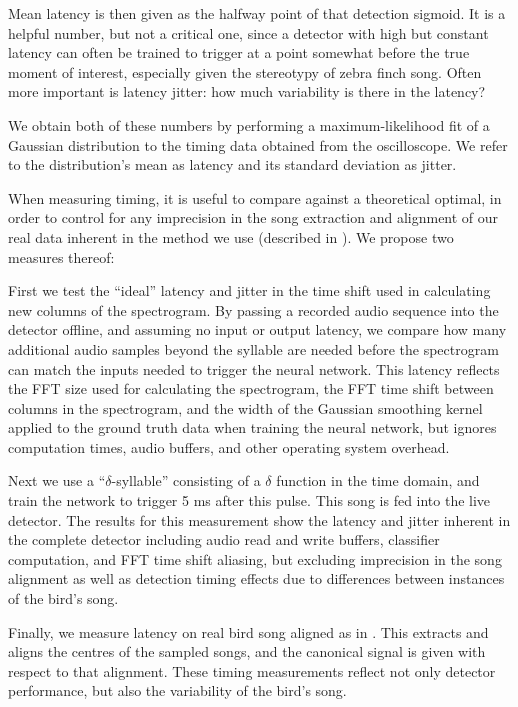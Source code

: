 \documentclass[10pt,letterpaper]{article}
\begin{document}
Mean latency is then given as the halfway point of that detection
sigmoid. It is a helpful number, but not a critical one, since a
detector with high but constant latency can often be trained to trigger at a
point somewhat before the true moment of interest, especially given the stereotypy of zebra finch song.  Often more
important is latency jitter: how much variability is there in
the latency?

We obtain both of these numbers by performing a maximum-likelihood fit of a Gaussian distribution to the timing data obtained from the oscilloscope.  We refer to the distribution's mean as latency and its standard deviation as jitter.

When measuring timing, it is useful to compare against a theoretical optimal, in order to control for any imprecision in the song extraction
and alignment of our real data inherent in the method we use (described in
\cite{Poole2012}).  We propose two measures thereof:

First we test the ``ideal'' latency and jitter in the time shift used in 
calculating new columns of the spectrogram. By passing a recorded 
audio sequence into the detector offline, and assuming no input or output 
latency, we compare how many additional audio 
samples beyond the syllable are needed before the spectrogram 
can match the inputs needed to trigger the neural network.  This latency reflects the 
FFT size used for calculating the spectrogram, the FFT time shift 
between columns in the spectrogram, and the width of the Gaussian 
smoothing kernel applied to the ground truth data when training 
the neural network, but ignores computation times, audio buffers, and other operating system overhead.

Next we use a ``$\delta$-syllable'' consisting
of a $\delta$ function in the time domain, and train the network to
trigger 5 ms after this pulse.  This song is fed into the live detector.  The results for this measurement show
the latency and jitter inherent in the complete detector
including audio read and write buffers, classifier
computation, and FFT time shift aliasing, but excluding imprecision in the song alignment as well as detection timing effects due to differences between instances of the bird's song.

Finally, we measure latency on real bird song aligned as in \cite{Poole2012}.  This extracts and aligns the centres of the sampled songs, and the canonical signal is given with respect to that alignment.  These timing measurements reflect not only detector performance, but also the variability of the bird's song.
\end{document}
